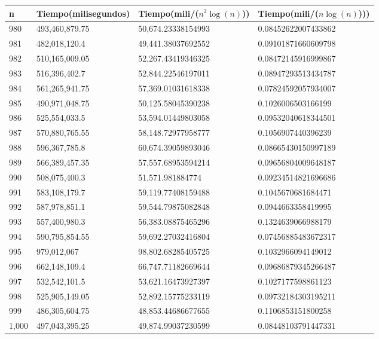\begin{table}[H]
\parbox{0.3\textwidth}{
    \begin{tabular}{ | l | l | l | l |}
    \hline
n   &Tiempo(milisegundos) &Tiempo(mili/($n^2 \log(n)$)) &Tiempo(mili/($n \log(n)$)))\\ \hline
980	&493,460,879.75	&50,674.23338154993	&0.08452622007433862\\ \hline
981	&482,018,120.4	&49,441.38037692552	&0.09101871660609798\\ \hline
982	&510,165,009.05	&52,267.43419346325	&0.08472145916999867\\ \hline
983	&516,396,402.7	&52,844.22546197011	&0.08947293513434787\\ \hline
984	&561,265,941.75	&57,369.01031618338	&0.07824592057934007\\ \hline
985	&490,971,048.75	&50,125.58045390238	&0.1026006503166199\\ \hline
986	&525,554,033.5	&53,594.01449803058	&0.09532040618344501\\ \hline
987	&570,880,765.55	&58,148.72977958777	&0.1056907440396239\\ \hline
988	&596,367,785.8	&60,674.39059893046	&0.08665430150997189\\ \hline
989	&566,389,457.35	&57,557.68953594214	&0.09656804009648187\\ \hline
990	&508,075,400.3	&51,571.981884774	&0.09234514821696686\\ \hline
991	&583,108,179.7	&59,119.77408159488	&0.1045670681684471\\ \hline
992	&587,978,851.1	&59,544.79875082848	&0.0944663358419995\\ \hline
993	&557,400,980.3	&56,383.08875465296	&0.1324639066988179\\ \hline
994	&590,795,854.55	&59,692.27032416804	&0.07456885483672317\\ \hline
995	&979,012,067	&98,802.68285405725	&0.1032966094149012\\ \hline
996	&662,148,109.4	&66,747.71182669644	&0.09686879345266487\\ \hline
997	&532,542,101.5	&53,621.16473927397	&0.1027177598861123\\ \hline
998	&525,905,149.05	&52,892.15775233119	&0.09732184303195211\\ \hline
999	&486,305,604.75	&48,853.44686677655	&0.1106853151800258\\ \hline
1,000	&497,043,395.25	&49,874.99037230599	&0.08448103791447331\\ \hline
    \end{tabular}
}
\end{table}

